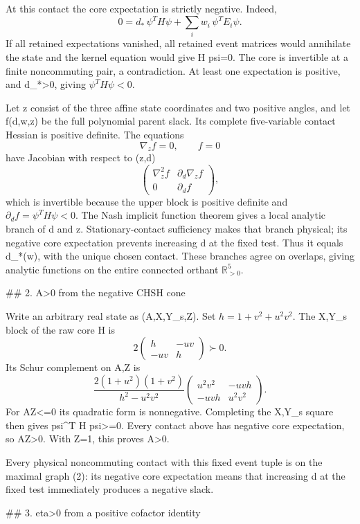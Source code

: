 At this contact the core expectation is strictly negative. Indeed,
\[
0=d_*\,\psi^TH\psi+\sum_i w_i\,\psi^TE_i\psi.
\]
If all retained expectations vanished, all retained event matrices would
annihilate the state and the kernel equation would give H psi=0. The core
is invertible at a finite noncommuting pair, a contradiction. At least one
expectation is positive, and d_*>0, giving \(\psi^TH\psi<0\).

Let z consist of the three affine state coordinates and two positive
angles, and let f(d,w,z) be the full polynomial parent slack. Its complete
five-variable contact Hessian is positive definite. The equations
\[
\nabla_z f=0,\qquad f=0
\]
have Jacobian with respect to (z,d)
\[
\begin{pmatrix} \nabla_z^2 f&\partial_d\nabla_z f\\
0&\partial_d f\end{pmatrix},
\]
which is invertible because the upper block is positive definite and
\(\partial_d f=\psi^TH\psi<0\). The Nash implicit function theorem gives
a local analytic branch of d and z. Stationary-contact sufficiency makes
that branch physical; its negative core expectation prevents increasing d
at the fixed test. Thus it equals d_*(w), with the unique chosen contact.
These branches agree on overlaps, giving analytic functions on the entire
connected orthant \(\mathbb R_{>0}^5\).

## 2. A>0 from the negative CHSH cone

Write an arbitrary real state as (A,X,Y_s,Z). Set
\(h=1+v^2+u^2v^2\). The X,Y_s block of the raw core H is
\[
2\begin{pmatrix}h&-uv\\-uv&h\end{pmatrix}\succ0.
\]
Its Schur complement on A,Z is
\[
\frac{2(1+u^2)(1+v^2)}{h^2-u^2v^2}
\begin{pmatrix}u^2v^2&-uvh\\-uvh&u^2v^2\end{pmatrix}.
\tag{3}
\]
For AZ<=0 its quadratic form is nonnegative. Completing the X,Y_s square
then gives psi^T H psi>=0. Every contact above has negative core
expectation, so AZ>0. With Z=1, this proves A>0.

Every physical noncommuting contact with this fixed event tuple is on the
maximal graph (2): its negative core expectation means that increasing d
at the fixed test immediately produces a negative slack.

## 3. eta>0 from a positive cofactor identity

